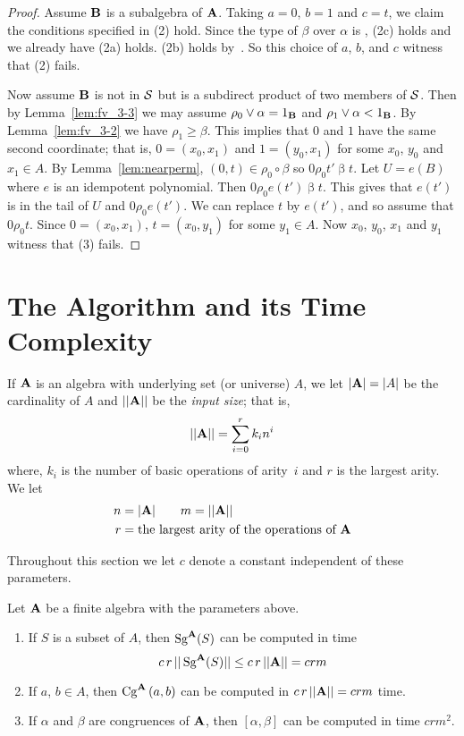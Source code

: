 \begin{proof}
Assume $\alg B$ is a subalgebra of $\alg A$. Taking 
$a=0$, $b=1$ and $c=t$, we claim the conditions specified
in (2) hold. 
Since the type of $\beta$ over $\alpha$ is \atyp,
(2c) holds and we already have (2a) holds. 
(2b) holds by~\cite[Theorem~2.4]{KearnesKiss1999}.
So this choice of $a$, $b$, and $c$ witness that (2) fails.




Now assume $\alg B$ is not in $\sS$ but is a subdirect 
product of two members of $\sS$.
Then
by Lemma~\ref{lem:fv_3-3} we may 
assume $\rho_0 \join \alpha = 1_{\alg B}$ and
$\rho_1 \join \alpha < 1_{\alg B}$. By Lemma~\ref{lem:fv_3-2}
we have $\rho_1 \ge \beta$.
This implies that $0$ and $1$ have the same second coordinate; that is,
$0 = (x_0,x_1)$ and $1 = (y_0,x_1)$ for some $x_0$, $y_0$ and $x_1\in A$.
By Lemma~\ref{lem:nearperm}, $(0,t) \in \rho_0 \circ \beta$
so $0 \mathrel {\rho_0} t' \mathrel{\beta} t$. Let $U = e(B)$
where $e$ is an idempotent polynomial. Then
$0 \mathrel {\rho_0} e(t') \mathrel{\beta} t$. This gives
that $e(t')$ is in the tail of $U$ and 
$0 \mathrel{\rho_0} e(t')$. We can
replace $t$ by $e(t')$, and so assume that 
$0 \mathrel{\rho_0} t$.
Since $0 = (x_0,x_1)$, $t = (x_0,y_1)$ for some $y_1\in A$. 
Now
$x_0$, $y_0$, $x_1$ and $y_1$ witness that (3) fails.
\end{proof}



\section{The Algorithm and its Time Complexity}

If $\alg A$ is an algebra with underlying set (or universe) $A$,
we let $|\alg A| = |A|$ be the cardinality of
$A$ and $||\alg A||$ be the \emph{input size}; that is,
\[
||\alg A|| = \sum_{i=0}^r k_i n^i
\]
where, $k_i$ is the number of basic operations of arity~$i$ and $r$
is the largest arity. We let
\begin{align*}
n &= |\alg A|  \qquad m = ||\alg A|| \\
r &= \text{the largest arity of the operations of $\alg A$}
\end{align*}

Throughout this section we let $c$ denote a constant independent of
these parameters.

\begin{prop}\label{speedprop}
Let $\alg A$ be a finite algebra with the parameters above.
\begin{enumerate}
\item If $S$ is a subset of $A$, then $\Sg^{\alg A}(S)$ can be computed
in time
\[
c\, r\,||\Sg^{\alg A}(S)|| \le c\, r\,||\alg A|| = crm
\]
\item If $a$, $b \in A$, then $\Cga a b A$ can be computed in
$c\, r\, ||\alg A|| = crm$ time.
\item
If $\alpha$ and $\beta$ are congruences of $\alg A$,
then $[\alpha,\beta]$ can be computed in time $crm^2$.
\end{enumerate}
\end{prop}

